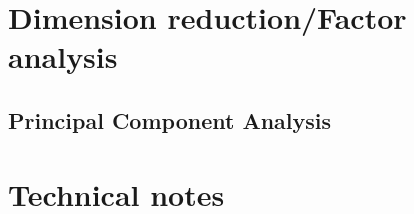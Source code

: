 \documentclass[10pt]{article}
\begin{document}
\newpage
\section{Dimension reduction/Factor analysis}
\subsection{Principal Component Analysis}

\newpage
\section{Technical notes}
\end{document}
